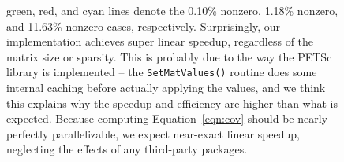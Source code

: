 \begin{figure}[t]
\begin{center}
{{        green, red, and cyan lines denote the 0.10\% nonzero, 1.18\% nonzero, and 11.63\%
        nonzero cases, respectively.  Surprisingly, our implementation achieves super linear
        speedup, regardless of the matrix size or sparsity.  This is probably due to the
        way the PETSc library is implemented -- the \texttt{SetMatValues()} routine does
        some internal caching before actually applying the values, and we think this
        explains why the speedup and efficiency are higher than what is expected.  Because
        computing Equation~\ref{eqn:cov} should be nearly perfectly parallelizable, we
        expect near-exact linear speedup, neglecting the effects of any third-party
        packages. }}
    \label{fig:cov}
  \end{center}
\end{figure}

